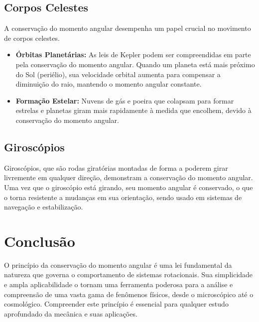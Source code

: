 \documentclass{article}
\begin{document}
\subsection{Corpos Celestes}
A conservação do momento angular desempenha um papel crucial no movimento de corpos celestes.
\begin{itemize}
    \item \textbf{Órbitas Planetárias:} As leis de Kepler podem ser compreendidas em parte pela conservação do momento angular. Quando um planeta está mais próximo do Sol (periélio), sua velocidade orbital aumenta para compensar a diminuição do raio, mantendo o momento angular constante.
    \item \textbf{Formação Estelar:} Nuvens de gás e poeira que colapsam para formar estrelas e planetas giram mais rapidamente à medida que encolhem, devido à conservação do momento angular.
\end{itemize}

\subsection{Giroscópios}
Giroscópios, que são rodas giratórias montadas de forma a poderem girar livremente em qualquer direção, demonstram a conservação do momento angular. Uma vez que o giroscópio está girando, seu momento angular é conservado, o que o torna resistente a mudanças em sua orientação, sendo usado em sistemas de navegação e estabilização.

\section{Conclusão}
O princípio da conservação do momento angular é uma lei fundamental da natureza que governa o comportamento de sistemas rotacionais. Sua simplicidade e ampla aplicabilidade o tornam uma ferramenta poderosa para a análise e compreensão de uma vasta gama de fenômenos físicos, desde o microscópico até o cosmológico. Compreender este princípio é essencial para qualquer estudo aprofundado da mecânica e suas aplicações.
\end{document}
